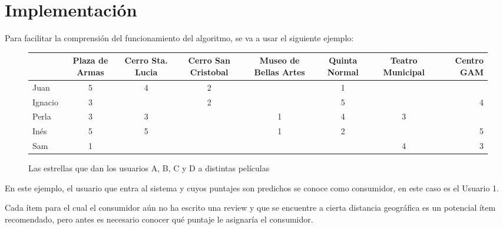 \chapter{Implementaci\'on}

Para facilitar la comprensión del funcionamiento del algoritmo, se va a usar el siguiente ejemplo:

\begin{figure}
\centering
\begin{adjustbox}{max width=\textwidth}
\begin{tabular}{l*{6}{c}r}
                  & Plaza de Armas & Cerro Sta. Lucia & Cerro San Cristobal & Museo de Bellas Artes & Quinta Normal  & Teatro Municipal & Centro GAM \\
\hline
Juan          & 5 & 4 & 2 &   & 1 &   &   \\
\hline
Ignacio       & 3 &   & 2 &   & 5 &   & 4 \\
\hline
Perla         & 3 & 3 &   & 1 & 4 & 3 &   \\
\hline
Inés          & 5 & 5 &   & 1 & 2 &   & 5 \\
\hline
Sam          & 1 &  &   &  &  & 4  & 3 \\


\end{tabular}
\end{adjustbox}
\caption{Las estrellas que dan los usuarios A, B, C y D a distintas películas}


\end{figure}

En este ejemplo, el usuario que entra al sistema y cuyos puntajes son predichos se conoce como consumidor, en este caso es el Usuario 1.

Cada ítem para el cual el consumidor aún no ha escrito una review y que se encuentre a cierta distancia geográfica es un potencial ítem recomendado, pero antes es necesario conocer qué puntaje le asignaría el consumidor.

